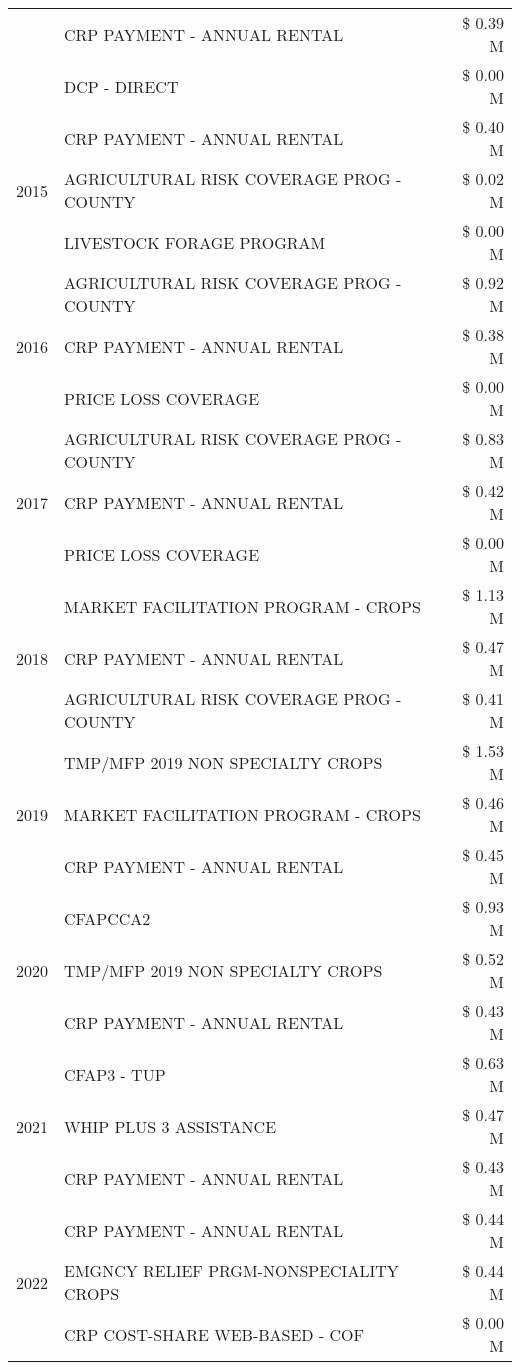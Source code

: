 \begin{tabular}{llr}
 & CRP PAYMENT - ANNUAL RENTAL & \$ 0.39 M \\
 & DCP - DIRECT & \$ 0.00 M \\
\cline{1-3}
\multirow[t]{3}{*}{2015} & CRP PAYMENT - ANNUAL RENTAL & \$ 0.40 M \\
 & AGRICULTURAL RISK COVERAGE PROG - COUNTY & \$ 0.02 M \\
 & LIVESTOCK FORAGE PROGRAM & \$ 0.00 M \\
\cline{1-3}
\multirow[t]{3}{*}{2016} & AGRICULTURAL RISK COVERAGE PROG - COUNTY & \$ 0.92 M \\
 & CRP PAYMENT - ANNUAL RENTAL & \$ 0.38 M \\
 & PRICE LOSS COVERAGE & \$ 0.00 M \\
\cline{1-3}
\multirow[t]{3}{*}{2017} & AGRICULTURAL RISK COVERAGE PROG - COUNTY & \$ 0.83 M \\
 & CRP PAYMENT - ANNUAL RENTAL & \$ 0.42 M \\
 & PRICE LOSS COVERAGE & \$ 0.00 M \\
\cline{1-3}
\multirow[t]{3}{*}{2018} & MARKET FACILITATION PROGRAM - CROPS & \$ 1.13 M \\
 & CRP PAYMENT - ANNUAL RENTAL & \$ 0.47 M \\
 & AGRICULTURAL RISK COVERAGE PROG - COUNTY & \$ 0.41 M \\
\cline{1-3}
\multirow[t]{3}{*}{2019} & TMP/MFP 2019 NON SPECIALTY CROPS & \$ 1.53 M \\
 & MARKET FACILITATION PROGRAM - CROPS & \$ 0.46 M \\
 & CRP PAYMENT - ANNUAL RENTAL & \$ 0.45 M \\
\cline{1-3}
\multirow[t]{3}{*}{2020} & CFAPCCA2 & \$ 0.93 M \\
 & TMP/MFP 2019 NON SPECIALTY CROPS & \$ 0.52 M \\
 & CRP PAYMENT - ANNUAL RENTAL & \$ 0.43 M \\
\cline{1-3}
\multirow[t]{3}{*}{2021} & CFAP3 - TUP & \$ 0.63 M \\
 & WHIP PLUS 3 ASSISTANCE & \$ 0.47 M \\
 & CRP PAYMENT - ANNUAL RENTAL & \$ 0.43 M \\
\cline{1-3}
\multirow[t]{3}{*}{2022} & CRP PAYMENT - ANNUAL RENTAL & \$ 0.44 M \\
 & EMGNCY RELIEF PRGM-NONSPECIALITY CROPS & \$ 0.44 M \\
 & CRP COST-SHARE WEB-BASED - COF & \$ 0.00 M \\
\cline{1-3}
\bottomrule
\end{tabular}
